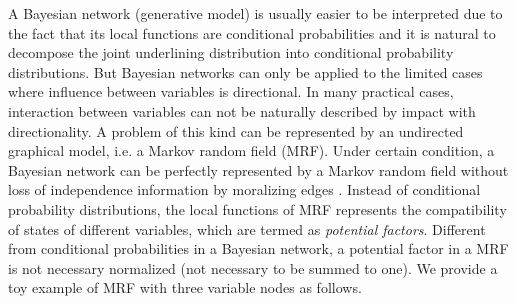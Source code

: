 A Bayesian network (generative model) is usually easier to be interpreted due to the fact that its local functions are conditional probabilities and it is natural to decompose the joint underlining distribution into conditional probability distributions. But Bayesian networks can only be applied to the limited cases where influence between variables is directional. In many practical cases, interaction between variables can not be naturally described by impact with directionality. A problem of this kind can be represented by an undirected graphical model, i.e. a Markov random field (MRF). Under certain condition, a Bayesian network can be perfectly represented by a Markov random field without loss of independence information by moralizing edges \cite[Chapter~4.5]{koller2009pgm}. Instead of conditional probability distributions, the local functions of MRF represents the compatibility of states of different variables, which are termed as \textit{potential factors}. Different from conditional probabilities in a Bayesian network, a potential factor in a MRF is not necessary normalized (not necessary to be summed to one). We provide a toy example of MRF with three variable nodes as follows.
